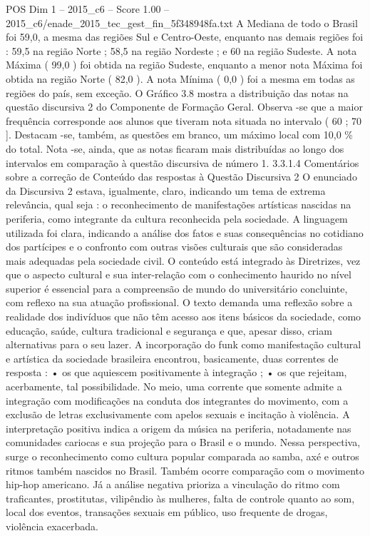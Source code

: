 \begin{textsample}{POS Dim 1 – 2015\_c6 – Score 1.00 – 2015\_c6/enade\_2015\_tec\_gest\_fin\_5f348948fa.txt}
A Mediana de todo o Brasil foi 59,0, a mesma das regiões Sul e Centro-Oeste, enquanto nas demais regiões foi : 59,5 na região Norte ; 58,5 na região Nordeste ; e 60 na região Sudeste.
A nota Máxima ( 99,0 ) foi obtida na região Sudeste, enquanto a menor nota Máxima foi obtida na região Norte ( 82,0 ).
A nota Mínima ( 0,0 ) foi a mesma em todas as regiões do país, sem exceção.
O Gráfico 3.8 mostra a distribuição das notas na questão discursiva 2 do Componente de Formação Geral.
Observa -se que a maior frequência corresponde aos alunos que tiveram nota situada no intervalo ( 60 ; 70 ].
Destacam -se, também, as questões em branco, um máximo local com 10,0 \% do total.
Nota -se, ainda, que as notas ficaram mais distribuídas ao longo dos intervalos em comparação à questão discursiva de número 1. 3.3.1.4 Comentários sobre a correção de Conteúdo das respostas à Questão Discursiva 2 O enunciado da Discursiva 2 estava, igualmente, claro, indicando um tema de extrema relevância, qual seja : o reconhecimento de manifestações artísticas nascidas na periferia, como integrante da cultura reconhecida pela sociedade.
A linguagem utilizada foi clara, indicando a análise dos fatos e suas consequências no cotidiano dos partícipes e o confronto com outras visões culturais que são consideradas mais adequadas pela sociedade civil.
O conteúdo está integrado às Diretrizes, vez que o aspecto cultural e sua inter-relação com o conhecimento haurido no nível superior é essencial para a compreensão de mundo do universitário concluinte, com reflexo na sua atuação profissional.
O texto demanda uma reflexão sobre a realidade dos indivíduos que não têm acesso aos itens básicos da sociedade, como educação, saúde, cultura tradicional e segurança e que, apesar disso, criam alternativas para o seu lazer.
A incorporação do funk como manifestação cultural e artística da sociedade brasileira encontrou, basicamente, duas correntes de resposta : • os que aquiescem positivamente à integração ; • os que rejeitam, acerbamente, tal possibilidade.
No meio, uma corrente que somente admite a integração com modificações na conduta dos integrantes do movimento, com a exclusão de letras exclusivamente com apelos sexuais e incitação à violência.
A interpretação positiva indica a origem da música na periferia, notadamente nas comunidades cariocas e sua projeção para o Brasil e o mundo.
Nessa perspectiva, surge o reconhecimento como cultura popular comparada ao samba, axé e outros ritmos também nascidos no Brasil.
Também ocorre comparação com o movimento hip-hop americano.
Já a análise negativa prioriza a vinculação do ritmo com traficantes, prostitutas, vilipêndio às mulheres, falta de controle quanto ao som, local dos eventos, transações sexuais em público, uso frequente de drogas, violência exacerbada.

\end{textsample}
